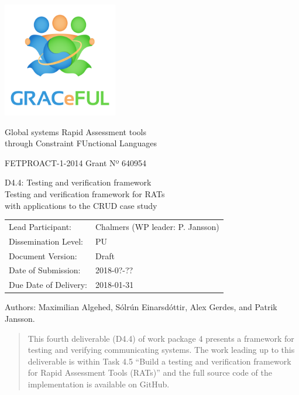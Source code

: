 \documentclass{article}
\author{}
\date{}
\begin{document}
\begin{center}
\includegraphics[width=5cm]{../coverpage/GRACeFULlogo.png}

\textcolor{GRACeFULblue}{Global systems Rapid Assessment tools\\
through Constraint FUnctional Languages}

\vspace{1cm}

FETPROACT-1-2014 Grant Nº 640954

\end{center}

\begin{framed}
\begin{center}
\Large
D4.4: Testing and verification framework\\[1ex]

\large
Testing and verification framework for RATs\\
with applications to the CRUD case study\\[1ex]

\end{center}
\end{framed}

\vspace{1cm}

\noindent
\begin{tabular}{@{}ll@{}}
  Lead Participant:       & Chalmers (WP leader: P. Jansson)
\\Dissemination Level:    & PU
\\Document Version:       & Draft
\\Date of Submission:     & 2018-0?-??
\\Due Date of Delivery:   & 2018-01-31
\end{tabular}

Authors: Maximilian Algehed, Sólrún Einarsdóttir, Alex Gerdes, and
Patrik Jansson.

\begin{abstract}

This fourth deliverable (D4.4) of work package 4 presents a framework for
testing and verifying communicating systems.
%
The work leading up to this deliverable is within Task 4.5 ``Build a
testing and verification framework for Rapid Assessment Tools (RATs)''
and the full source code of the implementation is available on GitHub.

\end{abstract}
\newpage
\end{document}
